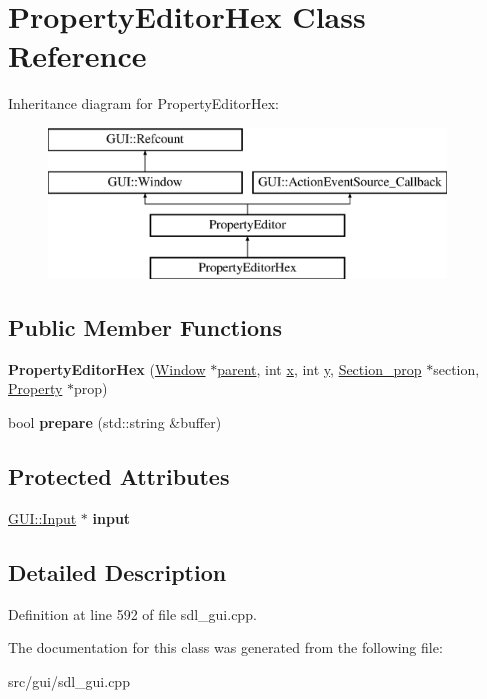 \hypertarget{classPropertyEditorHex}{\section{Property\-Editor\-Hex Class Reference}
\label{classPropertyEditorHex}
}
Inheritance diagram for Property\-Editor\-Hex\-:\begin{figure}[H]
\begin{center}
\leavevmode
\includegraphics[height=4.000000cm]{classPropertyEditorHex}
\end{center}
\end{figure}
\subsection*{Public Member Functions}
\begin{DoxyCompactItemize}
\item 
\hypertarget{classPropertyEditorHex_a7a21b5b6314a5dcdc29d255ff231e84c}{{\bfseries Property\-Editor\-Hex} (\hyperlink{classGUI_1_1Window_ae828e9daa964dfc65a3550fb03117d30}{Window} $\ast$\hyperlink{classGUI_1_1Window_a2e593ff65e7702178d82fe9010a0b539}{parent}, int \hyperlink{classGUI_1_1Window_a6ca6a80ca00c9e1d8ceea8d3d99a657d}{x}, int \hyperlink{classGUI_1_1Window_a0ee8e923aff2c3661fc2e17656d37adf}{y}, \hyperlink{classSection__prop}{Section\-\_\-prop} $\ast$section, \hyperlink{classProperty}{Property} $\ast$prop)}\label{classPropertyEditorHex_a7a21b5b6314a5dcdc29d255ff231e84c}

\item 
\hypertarget{classPropertyEditorHex_aae67d8ec3c95b536a6fc01c40e5541e9}{bool {\bfseries prepare} (std\-::string \&buffer)}\label{classPropertyEditorHex_aae67d8ec3c95b536a6fc01c40e5541e9}

\end{DoxyCompactItemize}
\subsection*{Protected Attributes}
\begin{DoxyCompactItemize}
\item 
\hypertarget{classPropertyEditorHex_ae4aaff687f15bb4ca498899dcd1d1812}{\hyperlink{classGUI_1_1Input}{G\-U\-I\-::\-Input} $\ast$ {\bfseries input}}\label{classPropertyEditorHex_ae4aaff687f15bb4ca498899dcd1d1812}

\end{DoxyCompactItemize}


\subsection{Detailed Description}


Definition at line 592 of file sdl\-\_\-gui.\-cpp.



The documentation for this class was generated from the following file\-:\begin{DoxyCompactItemize}
\item 
src/gui/sdl\-\_\-gui.\-cpp\end{DoxyCompactItemize}
